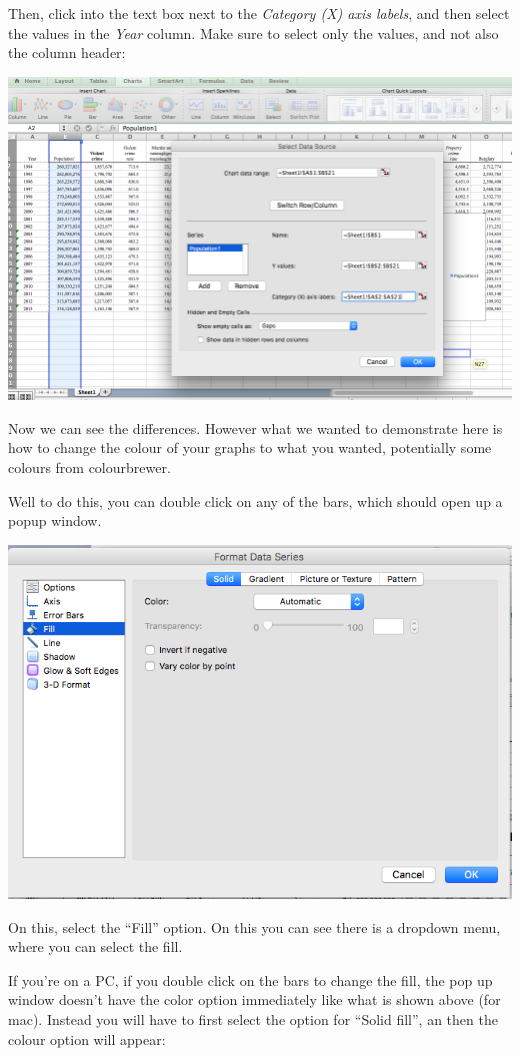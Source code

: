 \documentclass[
]{book}
\begin{document}
Then, click into the text box next to the \emph{Category (X) axis labels}, and then select the values in the \emph{Year} column. Make sure to select only the values, and not also the column header:

\includegraphics{imgs/pb3.png}

Now we can see the differences. However what we wanted to demonstrate here is how to change the colour of your graphs to what you wanted, potentially some colours from colourbrewer.

Well to do this, you can double click on any of the bars, which should open up a popup window.

\includegraphics{imgs/manual_fill_1.png}

On this, select the ``Fill'' option. On this you can see there is a dropdown menu, where you can select the fill.

If you're on a PC, if you double click on the bars to change the fill, the pop up window doesn't have the color option immediately like what is shown above (for mac). Instead you will have to first select the option for ``Solid fill'', an then the colour option will appear:
\end{document}
